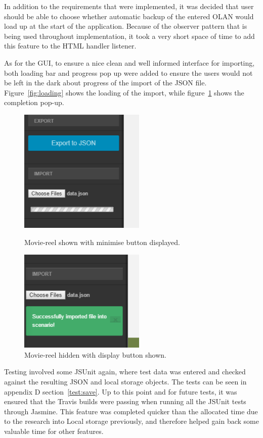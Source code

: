 In addition to the requirements that were implemented, it was decided that user should be able to choose whether automatic backup of the entered OLAN would load up at the start of the application. Because of the observer pattern that is being used throughout implementation, it took a very short space of time to add this feature to the HTML handler listener. 

As for the GUI, to ensure a nice clean and well informed interface for importing, both loading bar and progress pop up were added to ensure the users would not be left in the dark about progress of the import of the JSON file. Figure~\ref{fig:loading} shows the loading of the import, while figure~\ref{fig:loaded} shows the completion pop-up.

\begin{figure}[h!]
  \centering
  \parbox{7cm}{
    \includegraphics[width=6cm]{images/import.png}
    \caption{Movie-reel shown with minimise button displayed.}
    \label{fig:loading}}
  \qquad
  \begin{minipage}{7cm}
    \includegraphics[width=6cm]{images/loaded.png}
    \caption{Movie-reel hidden with display button shown.}
    \label{fig:loaded}
  \end{minipage}
\end{figure}

Testing involved some JSUnit again, where test data was entered and checked against the resulting JSON and local storage objects. The tests can be seen in appendix D section~\ref{test:save}. Up to this point and for future tests, it was ensured that the Travis builds were passing when running all the JSUnit tests through Jasmine. This feature was completed quicker than the allocated time due to the research into Local storage previously, and therefore helped gain back some valuable time for other features.

